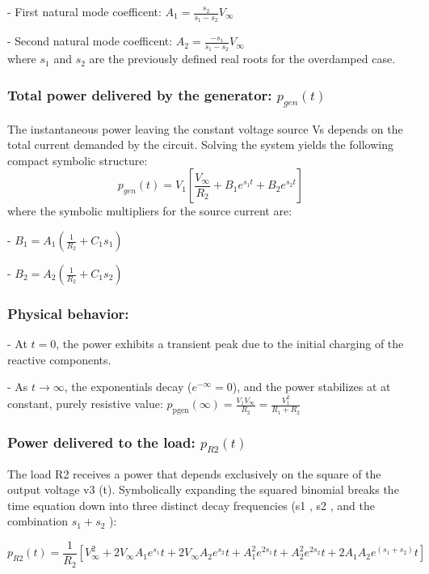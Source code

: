 \documentclass[11pt, a4paper]{article}
\begin{document}
- First natural mode  coefficent: $A_1 = \frac{s_2}{s_1-s_2}V_{\infty}$

- Second natural mode  coefficent: $A_2 = \frac{-s_1}{s_1-s_2}V_{\infty}$\\
where $s_1$ and $s_2$ are the previously defined real roots for the overdamped case.


\subsubsection*{Total power delivered by the generator: $p_{gen} (t)$}

The instantaneous power leaving the constant voltage source Vs depends on the total current demanded by the circuit. Solving the system yields the following compact symbolic
structure:
\[
p_{gen} (t) = V_1 \left[\frac{V_{\infty}}{R_2}+B_1e^{s_1t} + B_2 e^{s_2t} \right]
\]
where the symbolic multipliers for the source current are:

- $B_1 = A_1 \left(\frac{1}{R_2} + C_1 s_1\right)$

- $B_2 = A_2\left(\frac{1}{R_2} + C_1 s_2\right)$

\subsubsection*{Physical behavior:}

 - At $t = 0$, the power exhibits a transient peak due to the initial charging of the reactive components.

\noindent
- As $t \to \infty$, the exponentials decay ($e^ {-\infty} = 0$), and the power stabilizes at at constant, purely resistive value:
$p_{\mathrm{pgen}} (\infty) = \frac{V_1 V_{\infty}}{R_2} =
\frac{V_1^2}{R_1+R_2}$


\subsubsection*{Power delivered to the load: $p_{R2} (t)$}

The load R2 receives a power that depends exclusively on the square of the output voltage
v3 (t). Symbolically expanding the squared binomial breaks the time equation down into
three distinct decay frequencies (s1 , s2 , and the combination $s_1 + s_2$ ):

\[
p_{R2} (t) = \frac{1}{R_2}[ V_{\infty}^2
+ 2V_{\infty} A_1 e^{s_1} t + 2V_{\infty} A_2 e^{s_2}t + A^2_{1} e^{2s_1}t + A^2_{2} e^{2s_2}t
 + 2A_1 A_{2}e^{(s_1+s_2)} t]
\]
\end{document}
